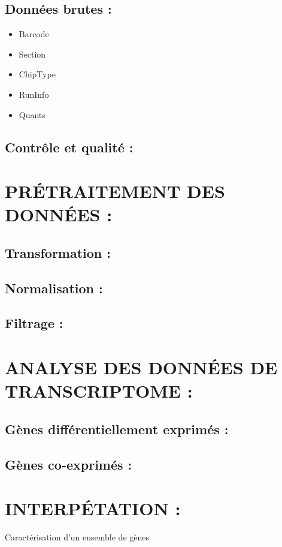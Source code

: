 \documentclass[a4paper,10pt]{article}
\begin{document}
\subsection{ Données brutes :}
\begin{itemize}
 \item  Barcode  
\item  Section 
\item  ChipType 
\item  RunInfo 
\item  Quants
\end{itemize}
\subsection{ Contrôle et qualité :}

\section{PR\'{E}TRAITEMENT DES DONN\'{E}ES :}
\subsection{Transformation :}
\subsection{Normalisation :}
\subsection{Filtrage :}

\section{ANALYSE DES DONN\'{E}ES DE TRANSCRIPTOME :}
\subsection{Gènes différentiellement exprimés :}
\subsection{Gènes co-exprimés :}

\section{INTERP\'{E}TATION :}
Caractérisation d’un ensemble de gènes
\begin{abstract}
\end{abstract}
\end{document}

